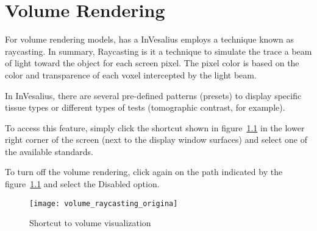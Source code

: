 \chapter{Volume Rendering}
\label{cap:vis_vol}

For volume rendering models, has a InVesalius employs a technique known as raycasting. In summary, Raycasting is it a technique to simulate the trace a beam of light toward the object for each screen pixel. The pixel color is based on the color and transparence of each voxel intercepted by the light beam.



In InVesalius, there are several pre-defined patterns (presets) to display specific tissue types or different types of tests (tomographic contrast, for example).


To access this feature, simply click the shortcut shown in figure~\ref{fig:volume_raycasting_origina} in the lower right corner of the screen (next to the display window surfaces) and select one of the available standards.


To turn off the volume rendering, click again on the path indicated by the figure~\ref{fig:volume_raycasting_origina} and select the Disabled option.

\begin{figure}[!htb]
\centering
\texttt{[image: volume\_raycasting\_origina]}
\caption{Shortcut to volume visualization}
\label{fig:volume_raycasting_origina}
\end{figure}

